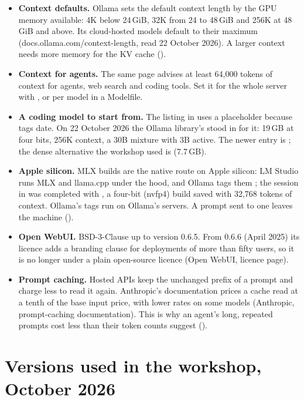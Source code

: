 \begin{itemize}
  \item \textbf{Context defaults.} Ollama sets the default context length by
    the GPU memory available: 4K below 24\,GiB, 32K from 24 to 48\,GiB and
    256K at 48\,GiB and above. Its cloud-hosted models default to their
    maximum (docs.ollama.com/context-length, read 22 October 2026). A larger
    context needs more memory for the KV cache ().
  \item \textbf{Context for agents.} The same page advises at least 64,000
    tokens of context for agents, web search and coding tools. Set it for the
    whole server with , or
    per model in a Modelfile.
  \item \textbf{A coding model to start from.} The listing in 
    uses a  placeholder because tags date. On 22 October 2026 the
    Ollama library's  stood in for it: 19\,GB at four
    bits, 256K context, a 30B mixture with 3B active. The newer entry is
    ; the dense alternative the workshop used is
     (7.7\,GB).
  \item \textbf{Apple silicon.} MLX builds are the native route on Apple
    silicon: LM Studio runs MLX and llama.cpp under the hood, and Ollama tags
    them ; the session in  was completed with
    , a four-bit (nvfp4) build saved with 32,768
    tokens of context. Ollama's  tags run on Ollama's servers.
    A prompt sent to one leaves the machine ().
  \item \textbf{Open WebUI.} BSD-3-Clause up to version 0.6.5. From 0.6.6
    (April 2025) its licence adds a branding clause for deployments of more
    than fifty users, so it is no longer under a plain open-source licence
    (Open WebUI, licence page).
  \item \textbf{Prompt caching.} Hosted APIs keep the unchanged prefix of a
    prompt and charge less to read it again. Anthropic's documentation prices
    a cache read at a tenth of the base input price, with lower rates on some
    models (Anthropic, prompt-caching documentation). This is why an agent's
    long, repeated prompts cost less than their token counts suggest
    ().
\end{itemize}

\section{Versions used in the workshop, October 2026}

